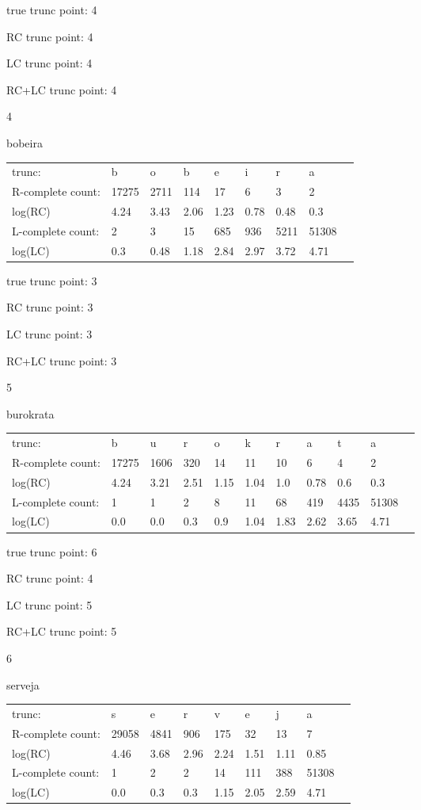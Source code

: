\documentclass{article}
\begin{document}
true trunc point: 4

RC trunc point: 4

LC trunc point: 4

RC+LC trunc point: 4

\vspace{1em}

4

bobeira

\begin{tabular}{l|llllllll}
trunc: & b & o & b & e & i & r & a & \\ 
R-complete count: & 17275 & 2711 & 114 & 17 & 6 & 3 & 2 & \\ 
log(RC) & 4.24 & 3.43 & 2.06 & 1.23 & 0.78 & 0.48 & 0.3 & \\ 
L-complete count: & 2 & 3 & 15 & 685 & 936 & 5211 & 51308 & \\ 
log(LC) & 0.3 & 0.48 & 1.18 & 2.84 & 2.97 & 3.72 & 4.71 & \\ 
\end{tabular}

true trunc point: 3

RC trunc point: 3

LC trunc point: 3

RC+LC trunc point: 3

\newpage

5

burokrata

\begin{tabular}{l|llllllllll}
trunc: & b & u & r & o & k & r & a & t & a & \\ 
R-complete count: & 17275 & 1606 & 320 & 14 & 11 & 10 & 6 & 4 & 2 & \\ 
log(RC) & 4.24 & 3.21 & 2.51 & 1.15 & 1.04 & 1.0 & 0.78 & 0.6 & 0.3 & \\ 
L-complete count: & 1 & 1 & 2 & 8 & 11 & 68 & 419 & 4435 & 51308 & \\ 
log(LC) & 0.0 & 0.0 & 0.3 & 0.9 & 1.04 & 1.83 & 2.62 & 3.65 & 4.71 & \\ 
\end{tabular}

true trunc point: 6

RC trunc point: 4

LC trunc point: 5

RC+LC trunc point: 5

\vspace{1em}

6

serveja

\begin{tabular}{l|llllllll}
trunc: & s & e & r & v & e & j & a & \\ 
R-complete count: & 29058 & 4841 & 906 & 175 & 32 & 13 & 7 & \\ 
log(RC) & 4.46 & 3.68 & 2.96 & 2.24 & 1.51 & 1.11 & 0.85 & \\ 
L-complete count: & 1 & 2 & 2 & 14 & 111 & 388 & 51308 & \\ 
log(LC) & 0.0 & 0.3 & 0.3 & 1.15 & 2.05 & 2.59 & 4.71 & \\ 
\end{tabular}
\end{document}
